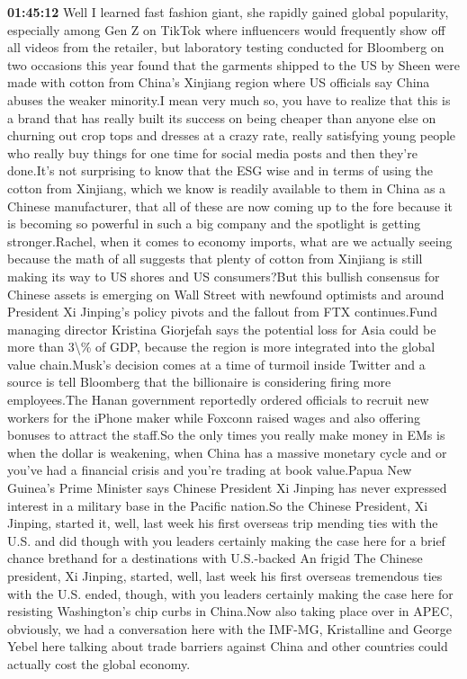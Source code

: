 \documentclass{article}%
\begin{document}
\textbf{01:45:12}%
\newline%
Well I learned fast fashion giant, she rapidly gained global popularity, especially among Gen Z on TikTok where influencers would frequently show off all videos from the retailer, but laboratory testing conducted for Bloomberg on two occasions this year found that the garments shipped to the US by Sheen were made with cotton from China's Xinjiang region where US officials say China abuses the weaker minority.I mean very much so, you have to realize that this is a brand that has really built its success on being cheaper than anyone else on churning out crop tops and dresses at a crazy rate, really satisfying young people who really buy things for one time for social media posts and then they're done.It's not surprising to know that the ESG wise and in terms of using the cotton from Xinjiang, which we know is readily available to them in China as a Chinese manufacturer, that all of these are now coming up to the fore because it is becoming so powerful in such a big company and the spotlight is getting stronger.Rachel, when it comes to economy imports, what are we actually seeing because the math of all suggests that plenty of cotton from Xinjiang is still making its way to US shores and US consumers?But this bullish consensus for Chinese assets is emerging on Wall Street with newfound optimists and around President Xi Jinping's policy pivots and the fallout from FTX continues.Fund managing director Kristina Giorjefah says the potential loss for Asia could be more than 3\textbackslash{}\% of GDP, because the region is more integrated into the global value chain.Musk's decision comes at a time of turmoil inside Twitter and a source is tell Bloomberg that the billionaire is considering firing more employees.The Hanan government reportedly ordered officials to recruit new workers for the iPhone maker while Foxconn raised wages and also offering bonuses to attract the staff.So the only times you really make money in EMs is when the dollar is weakening, when China has a massive monetary cycle and or you've had a financial crisis and you're trading at book value.Papua New Guinea's Prime Minister says Chinese President Xi Jinping has never expressed interest in a military base in the Pacific nation.So the Chinese President, Xi Jinping, started it, well, last week his first overseas trip mending ties with the U.S. and did though with you leaders certainly making the case here for a brief chance brethand for a destinations with U.S.{-}backed An frigid  The Chinese president, Xi Jinping, started, well, last week his first overseas tremendous ties with the U.S. ended, though, with you leaders certainly making the case here for resisting Washington's chip curbs in China.Now also taking place over in APEC, obviously, we had a conversation here with the IMF{-}MG, Kristalline and George Yebel here talking about trade barriers against China and other countries could actually cost the global economy.%
\end{document}

